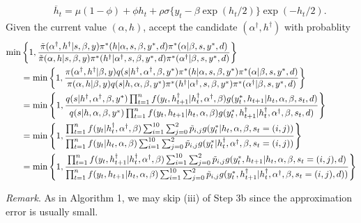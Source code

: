 \begin{itemize}
\begin{itemize}
\begin{align*}
            &\quad \overline{h}_t = \mu(1-\phi) + \phi h_t + \rho \sigma \{ y_t - \beta \exp(h_t/2) \} \exp(-h_t/2).
        \end{align*}
        Given the current value $(\alpha,h)$, accept the candidate $(\alpha^\dag,h^\dag)$ with probablity
        \begin{align*}
            \min &\left\{ 1, \frac{\Tilde{\pi}(\alpha^\dag, h^\dag| s, \beta, y)\pi^*(h|\alpha, s, \beta,y ^*,d)\pi^*(\alpha|\beta,s,y^*,d)}{\Tilde{\pi}(\alpha, h|s, \beta,y)\pi^*(h^\dag|\alpha^{\dagger}, s, \beta, y^*,d)\pi^*(\alpha^{\dagger}|\beta,s,y^*,d)} \right\} \\
            &= \min \left\{ 1, \frac{\pi(\alpha^\dag, h^\dag| \beta,y) q(s|h^\dag,\alpha^\dag,\beta, y^*) \pi^*(h|\alpha, s,\beta, y^*)\pi^*(\alpha|\beta,s,y^*,d)}{\pi(\alpha,h|\beta,y) q(s|h,\alpha,\beta, y^*) \pi^*(h^\dag|\alpha^{\dagger}, s, \beta, y^*)\pi^*(\alpha^{\dagger}|\beta,s,y^*,d)} \right\} \\
            &= \min \left\{ 1, \frac{q(s|h^\dag,\alpha^\dag,\beta, y^*) \prod_{t=1}^n f(y_t, h_{t+1}^\dag| h_t^\dag, \alpha^\dag,\beta) g(y_t^*, h_{t+1}| h_t, \alpha,\beta, s_t, d) }{q(s|h,\alpha,\beta, y^*)\prod_{t=1}^n f(y_t, h_{t+1}| h_t, \alpha,\beta) g(y_t^*, h_{t+1}^\dag| h_t^\dag, \alpha^\dag,\beta, s_t, d) } \right\} \\
            &= \min \left\{ 1, \frac{\prod_{t=1}^n f(y_t| h_t^\dag, \alpha^\dag,\beta) \sum_{i=1}^{10}\sum_{j=0}^2 \Tilde{p}_{i,j} g(y_t^*| h_t, \alpha,\beta, s_t=(i,j)) }{\prod_{t=1}^n f(y_t| h_t, \alpha,\beta) \sum_{i=1}^{10}\sum_{j=0}^2 \Tilde{p}_{i,j} g(y_t^*| h_t^\dag, \alpha^\dag,\beta, s_t=(i,j)) } \right\} \\
            &= \min \left\{ 1, \frac{\prod_{t=1}^n f(y_t, h_{t+1}^\dag| h_t^\dag, \alpha^\dag,\beta) \sum_{i=1}^{10}\sum_{j=0}^2 \Tilde{p}_{i,j} g(y_t^*, h_{t+1}| h_t, \alpha,\beta, s_t=(i,j), d) }{\prod_{t=1}^nf(y_t, h_{t+1}| h_t, \alpha,\beta) \sum_{i=1}^{10}\sum_{j=0}^2 \Tilde{p}_{i,j} g(y_t^*, h_{t+1}^\dag| h_t^\dag, \alpha^\dag,\beta, s_t=(i,j), d)) } \right\} \\
       \end{align*}
    \end{itemize}
\end{itemize}
\bigskip

\noindent
{\it Remark}. As in Algorithm 1, we may skip (iii) of Step 3b since the approximation error is usually small. 
